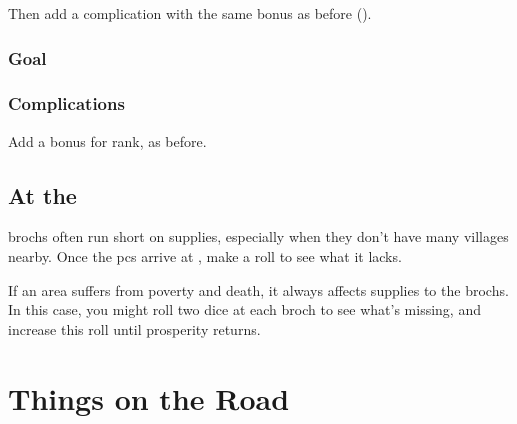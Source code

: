 \begin{multicols}{2}
Then add a complication with the same bonus as before ().

\subsubsection{Goal}

\ngMissions

\subsubsection{Complications}

Add a bonus for rank, as before.

\missionComplications

\subsection{At the }

\Glspl{broch} often run short on supplies, especially when they don't have many \glspl{village} nearby.
Once the \glspl{pc} arrive at , make a roll to see what it lacks.

\brochDerths

If an area suffers from poverty and death, it always affects supplies to the \glspl{broch}.
In this case, you might roll two dice at each \gls{broch} to see what's missing, and increase this roll until prosperity returns.

\end{multicols}

\section{Things on the Road}
\label{randomEncounters}

